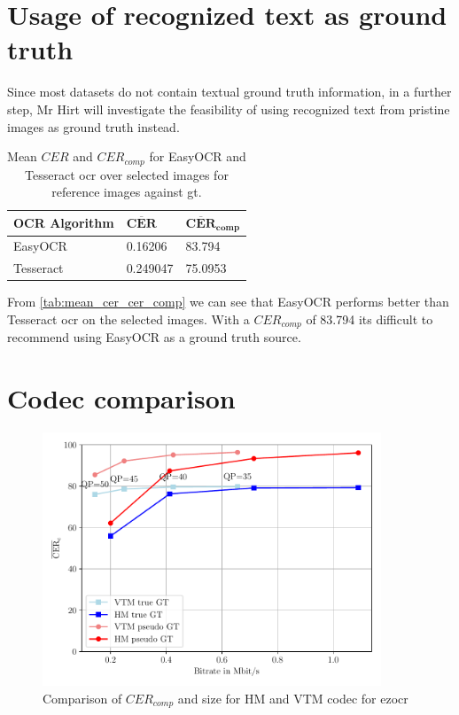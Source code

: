 \section{Usage of recognized text as ground truth}
\label{sec:usage_of_recognized_text_as_ground_truth}

Since most datasets do not contain textual ground truth information,
in a further step, Mr Hirt will investigate the feasibility of
using recognized text from pristine images as ground truth instead.

\begin{table}[h]
\centering
\begin{tabular}{|l|l|l|}
    \hline
    \rule{0em}{1em} \textbf{OCR Algorithm} & $\mathbf{\overline{CER}}$ & $\mathbf{\overline{CER}_{comp}}$ \\
    \hline
    EasyOCR & 0.16206 & 83.794 \\
    \hline
    Tesseract & 0.249047 & 75.0953 \\
    \hline
\end{tabular}
\caption{Mean $CER$ and $CER_{comp}$ for EasyOCR and Tesseract \gls{ocr} over selected images for reference images against \gls{gt}.}
\label{tab:mean_cer_cer_comp}
\end{table}

From \autoref{tab:mean_cer_cer_comp} we can see that EasyOCR performs better than Tesseract \gls{ocr} on the selected images.
With a $CER_{comp}$ of 83.794 its difficult to recommend using EasyOCR as a ground truth source.

\section{Codec comparison}
\label{sec:codec_comparison}

\begin{figure}[h]
    \centering
    \includegraphics[width=0.9\textwidth]{../images/analyze/codec_cer_size_ezocr_default.pdf}
    \caption{Comparison of $CER_{comp}$ and size for HM and VTM codec for ezocr}
    \label{fig:codec_cer_size_ezocr_default}
\end{figure}

